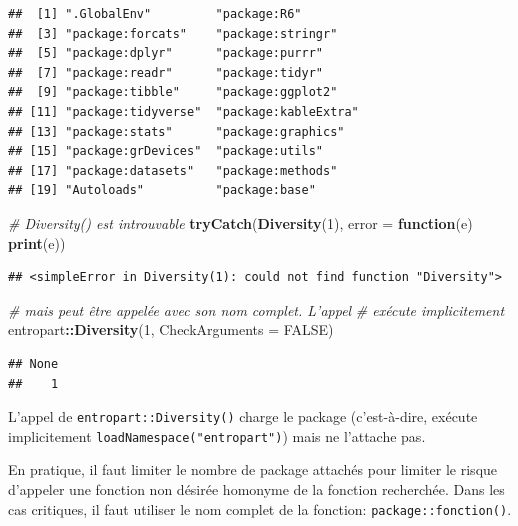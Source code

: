\documentclass[
  12pt,
  french,
  a4paper,
  extrafontsizes,onecolumn,openright
  ]{memoir}
\newenvironment{Shaded}{\begin{snugshade}}{\end{snugshade}}
\newcommand{\CommentTok}[1]{\textcolor[rgb]{0.56,0.35,0.01}{\textit{#1}}}
\newcommand{\ControlFlowTok}[1]{\textcolor[rgb]{0.13,0.29,0.53}{\textbf{#1}}}
\newcommand{\DataTypeTok}[1]{\textcolor[rgb]{0.13,0.29,0.53}{#1}}
\newcommand{\DecValTok}[1]{\textcolor[rgb]{0.00,0.00,0.81}{#1}}
\newcommand{\KeywordTok}[1]{\textcolor[rgb]{0.13,0.29,0.53}{\textbf{#1}}}
\newcommand{\NormalTok}[1]{#1}
\newcommand{\OperatorTok}[1]{\textcolor[rgb]{0.81,0.36,0.00}{\textbf{#1}}}
\newcommand{\OtherTok}[1]{\textcolor[rgb]{0.56,0.35,0.01}{#1}}
\begin{document}
\begin{verbatim}
##  [1] ".GlobalEnv"         "package:R6"        
##  [3] "package:forcats"    "package:stringr"   
##  [5] "package:dplyr"      "package:purrr"     
##  [7] "package:readr"      "package:tidyr"     
##  [9] "package:tibble"     "package:ggplot2"   
## [11] "package:tidyverse"  "package:kableExtra"
## [13] "package:stats"      "package:graphics"  
## [15] "package:grDevices"  "package:utils"     
## [17] "package:datasets"   "package:methods"   
## [19] "Autoloads"          "package:base"
\end{verbatim}

\begin{Shaded}
\begin{Highlighting}[]
\CommentTok{# Diversity() est introuvable}
\KeywordTok{tryCatch}\NormalTok{(}\KeywordTok{Diversity}\NormalTok{(}\DecValTok{1}\NormalTok{), }\DataTypeTok{error =} \ControlFlowTok{function}\NormalTok{(e) }\KeywordTok{print}\NormalTok{(e))}
\end{Highlighting}
\end{Shaded}

\begin{verbatim}
## <simpleError in Diversity(1): could not find function "Diversity">
\end{verbatim}

\begin{Shaded}
\begin{Highlighting}[]
\CommentTok{# mais peut être appelée avec son nom complet.  L'appel}
\CommentTok{# exécute implicitement}
\NormalTok{entropart}\OperatorTok{::}\KeywordTok{Diversity}\NormalTok{(}\DecValTok{1}\NormalTok{, }\DataTypeTok{CheckArguments =} \OtherTok{FALSE}\NormalTok{)}
\end{Highlighting}
\end{Shaded}

\begin{verbatim}
## None 
##    1
\end{verbatim}

\normalsize

L'appel de \texttt{entropart::Diversity()} charge le package (c'est-à-dire, exécute implicitement \texttt{loadNamespace("entropart")}) mais ne l'attache pas.

En pratique, il faut limiter le nombre de package attachés pour limiter le risque d'appeler une fonction non désirée homonyme de la fonction recherchée.
Dans les cas critiques, il faut utiliser le nom complet de la fonction: \texttt{package::fonction()}.
\end{document}
